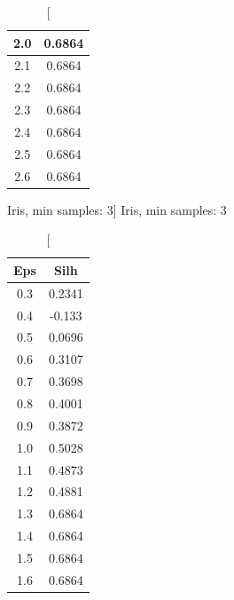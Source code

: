 \documentclass{classrep}
\begin{document}
{{{\begin{table}[!htbp]
\begin{minipage}{.24\textwidth}
\begin{tabular}{|c|c|}
                            2.0 & 0.6864 \\ \hline
                            2.1 & 0.6864 \\ \hline
                            2.2 & 0.6864 \\ \hline
                            2.3 & 0.6864 \\ \hline
                            2.4 & 0.6864 \\ \hline
                            2.5 & 0.6864 \\ \hline
                            2.6 & 0.6864 \\ \hline
                        \end{tabular}
                        \caption
                        [Iris, min samples: 3]
                        {Iris, min samples: 3}
                        \label{db_scan_table_Iris_manh_min_sample3}
                    \end{minipage}
                    \hfill
                    \begin{minipage}{.24\textwidth}
                        \centering
                        \begin{tabular}{|c|c|}
                            \hline
                            Eps & Silh \\ \hline
                            0.3 & 0.2341 \\ \hline
                            0.4 & -0.133 \\ \hline
                            0.5 & 0.0696 \\ \hline
                            0.6 & 0.3107 \\ \hline
                            0.7 & 0.3698 \\ \hline
                            0.8 & 0.4001 \\ \hline
                            0.9 & 0.3872 \\ \hline
                            1.0 & 0.5028 \\ \hline
                            1.1 & 0.4873 \\ \hline
                            1.2 & 0.4881 \\ \hline
                            1.3 & 0.6864 \\ \hline
                            1.4 & 0.6864 \\ \hline
                            1.5 & 0.6864 \\ \hline
                            1.6 & 0.6864 \\ \hline

\end{tabular}
\end{minipage}
\end{table}}}}
\end{document}
